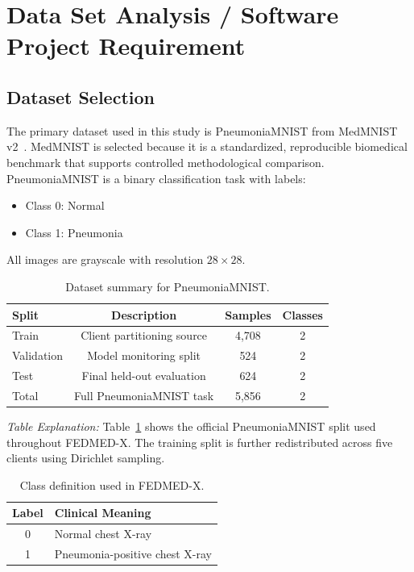 \section{Data Set Analysis / Software Project Requirement}

\subsection{Dataset Selection}
The primary dataset used in this study is PneumoniaMNIST from MedMNIST
v2~\cite{yang2023medmnist}. MedMNIST is selected because it is a
standardized, reproducible biomedical benchmark that supports controlled
methodological comparison. PneumoniaMNIST is a binary classification task
with labels:
\begin{itemize}[leftmargin=*]
  \item Class 0: Normal
  \item Class 1: Pneumonia
\end{itemize}
All images are grayscale with resolution $28 \times 28$.

\begin{table}[!htbp]
\centering
\caption{Dataset summary for PneumoniaMNIST.}
\label{tab:dataset}
\small
\begin{tabular}{@{}lccc@{}}
\toprule
\textbf{Split} & \textbf{Description} & \textbf{Samples} & \textbf{Classes} \\
\midrule
Train      & Client partitioning source  & 4{,}708 & 2 \\
Validation & Model monitoring split      & 524     & 2 \\
Test       & Final held-out evaluation   & 624     & 2 \\
\midrule
Total      & Full PneumoniaMNIST task    & 5{,}856 & 2 \\
\bottomrule
\end{tabular}
\end{table}

\noindent\emph{Table Explanation:} Table~\ref{tab:dataset} shows the
official PneumoniaMNIST split used throughout FEDMED-X. The training split
is further redistributed across five clients using Dirichlet sampling.

\begin{table}[!htbp]
\centering
\caption{Class definition used in FEDMED-X.}
\label{tab:classes}
\small
\begin{tabular}{@{}cl@{}}
\toprule
\textbf{Label} & \textbf{Clinical Meaning} \\
\midrule
0 & Normal chest X-ray \\
1 & Pneumonia-positive chest X-ray \\
\bottomrule
\end{tabular}
\end{table}

